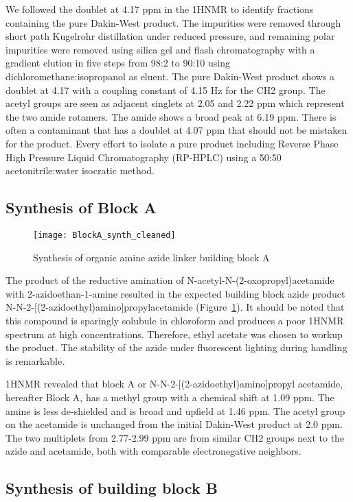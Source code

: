We followed the doublet at 4.17 ppm in the 1HNMR to identify fractions containing the pure Dakin-West product. The impurities were removed through short path Kugelrohr distillation under reduced pressure, and remaining polar impurities were removed using silica gel and flash chromatography with a gradient elution in five steps from 98:2 to 90:10 using dichloromethane:isopropanol as eluent. The pure Dakin-West product shows a doublet at 4.17 with a coupling constant of 4.15 Hz for the CH2 group. The acetyl groups are seen as adjacent singlets at 2.05 and 2.22 ppm which represent the two amide rotamers. The amide shows a broad peak at 6.19 ppm. There is often a contaminant that has a doublet at 4.07 ppm that should not be mistaken for the product. Every effort to isolate a pure product including Reverse Phase High Pressure Liquid Chromatography (RP-HPLC) using a 50:50 acetonitrile:water isocratic method. 

\subsection{Synthesis of Block A}

\begin{figure}
\texttt{[image: BlockA\_synth\_cleaned]}
\caption{Synthesis of organic amine azide linker building block A}
\label{fig:BlockA}
\end{figure}

The product of the reductive amination of N-acetyl-N-(2-oxopropyl)acetamide with 2-azidoethan-1-amine resulted in the expected building block azide product N-N-2-[(2-azidoethyl)amino]propylacetamide (Figure~\ref{fig:BlockA}). It should be noted that this compound is sparingly solubule in chloroform and produces a poor 1HNMR spectrum at high concentrations. Therefore, ethyl acetate was chosen to workup the product. The stability of the azide under fluorescent lighting during handling is remarkable. 

1HNMR revealed that block A or N-N-2-[(2-azidoethyl)amino]propyl acetamide, hereafter Block A, has a methyl group with a chemical shift at 1.09 ppm. The amine is less de-shielded and is broad and upfield at 1.46 ppm. The acetyl group on the acetamide is unchanged from the initial Dakin-West product at 2.0 ppm. The two multiplets from 2.77-2.99 ppm are from similar CH2 groups next to the azide and acetamide, both with comparable electronegative neighbors.


\subsection{Synthesis of building block B}

